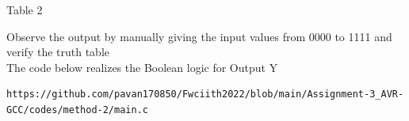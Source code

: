 \documentclass[10pt, a4paper]{article}
\begin{document}
\begin{center}
Table 2
\end{center}

Observe the output by manually giving  the input values from 0000 to 1111  and verify the truth table
\\The code below realizes the Boolean logic for Output Y
\begin{lstlisting}
https://github.com/pavan170850/Fwciith2022/blob/main/Assignment-3_AVR-GCC/codes/method-2/main.c
\end{lstlisting}


\end{document}
